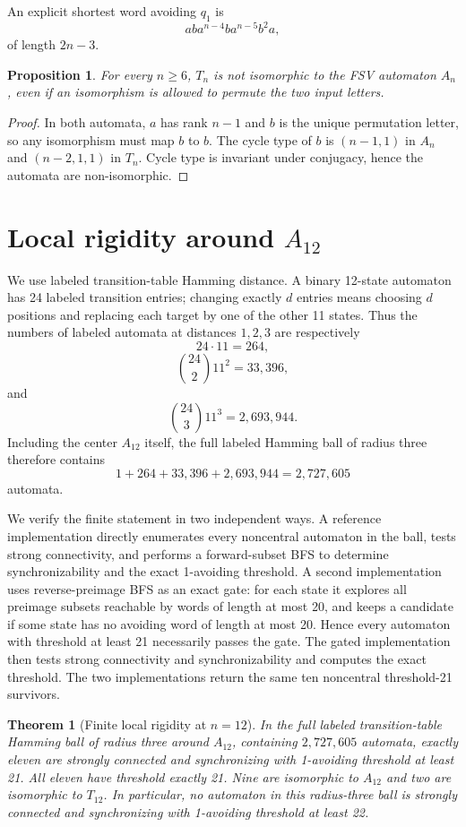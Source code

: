 \documentclass[11pt]{article}
\newtheorem{theorem}{Theorem}
\newtheorem{proposition}{Proposition}
\theoremstyle{definition}
\theoremstyle{remark}
\begin{document}
An explicit shortest word avoiding $q_1$ is
\[
 a b a^{n-4} b a^{n-5} b^2 a,
\]
of length $2n-3$.

\begin{proposition}\label{prop:noniso}
For every $n\ge6$, $T_n$ is not isomorphic to the FSV automaton $A_n$, even if an isomorphism is allowed to permute the two input letters.
\end{proposition}
\begin{proof}
In both automata, $a$ has rank $n-1$ and $b$ is the unique permutation letter, so any isomorphism must map $b$ to $b$. The cycle type of $b$ is $(n-1,1)$ in $A_n$ and $(n-2,1,1)$ in $T_n$. Cycle type is invariant under conjugacy, hence the automata are non-isomorphic.
\end{proof}

\section{Local rigidity around \texorpdfstring{$A_{12}$}{A12}}
We use labeled transition-table Hamming distance. A binary 12-state automaton has 24 labeled transition entries; changing exactly $d$ entries means choosing $d$ positions and replacing each target by one of the other 11 states. Thus the numbers of labeled automata at distances $1,2,3$ are respectively
\[
24\cdot11=264,
\]
\[
\binom{24}{2}11^2=33{,}396,
\]
and
\[
\binom{24}{3}11^3=2{,}693{,}944.
\]
Including the center $A_{12}$ itself, the full labeled Hamming ball of radius three therefore contains
\[
1+264+33{,}396+2{,}693{,}944=2{,}727{,}605
\]
automata.

We verify the finite statement in two independent ways. A reference implementation directly enumerates every noncentral automaton in the ball, tests strong connectivity, and performs a forward-subset BFS to determine synchronizability and the exact 1-avoiding threshold. A second implementation uses reverse-preimage BFS as an exact gate: for each state it explores all preimage subsets reachable by words of length at most 20, and keeps a candidate if some state has no avoiding word of length at most 20. Hence every automaton with threshold at least 21 necessarily passes the gate. The gated implementation then tests strong connectivity and synchronizability and computes the exact threshold. The two implementations return the same ten noncentral threshold-21 survivors.

\begin{theorem}[Finite local rigidity at $n=12$]\label{thm:local}
In the full labeled transition-table Hamming ball of radius three around $A_{12}$, containing $2{,}727{,}605$ automata, exactly eleven are strongly connected and synchronizing with 1-avoiding threshold at least 21. All eleven have threshold exactly 21. Nine are isomorphic to $A_{12}$ and two are isomorphic to $T_{12}$. In particular, no automaton in this radius-three ball is strongly connected and synchronizing with 1-avoiding threshold at least 22.
\end{theorem}
\end{document}
